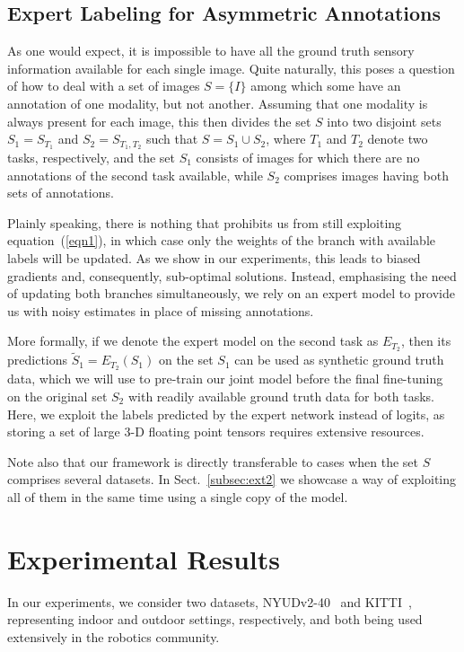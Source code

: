 \documentclass[letterpaper, 10 pt, conference]{ieeeconf}
\begin{document}
\subsection{Expert Labeling for Asymmetric Annotations}
\label{subsec:exp}
As one would expect, it is impossible to have all the ground truth sensory information available for each single image. Quite naturally, this poses a question of how to deal with a set of images $S=\{I\}$ among which some have an annotation of one modality, but not another. Assuming that one modality is always present for each image, this then divides the set $S$ into two disjoint sets $S_{1}=S_{T_{1}}$ and $S_{2}=S_{T_{1},T_{2}}$ such that $S=S_{1}\cup{S_{2}}$, where $T_{1}$ and $T_{2}$ denote two tasks, respectively, and the set $S_{1}$ consists of images for which there are no annotations of the second task available, while $S_{2}$ comprises images having both sets of annotations.

Plainly speaking, there is nothing that prohibits us from still exploiting equation~(\ref{eqn1}), in which case only the weights of the branch with available labels will be updated. As we show in our experiments, this leads to biased gradients and, consequently, sub-optimal solutions. Instead, emphasising the need of updating both branches simultaneously, we rely on an expert model to provide us with noisy estimates in place of missing annotations.

More formally, if we denote the expert model on the second task as $E_{T_{2}}$, then its predictions $\tilde{S}_{1}=E_{T_{2}}(S_{1})$ on the set $S_{1}$ can be used as synthetic ground truth data, which we will use to pre-train our joint model before the final fine-tuning on the original set $S_{2}$ with readily available ground truth data for both tasks. Here, we exploit the labels predicted by the expert network instead of logits, as storing a set of large $3$-D floating point tensors requires extensive resources.

Note also that our framework is directly transferable to cases when the set $S$ comprises several datasets. In Sect.~\ref{subsec:ext2} we showcase a way of exploiting all of them in the same time using a single copy of the model.

\section{Experimental Results}
\label{sec:result}

In our experiments, we consider two datasets, NYUDv2-40~\cite{SilbermanHKF12,GuptaAM13} and KITTI~\cite{GeigerLSU13,ros:2015}, representing indoor and outdoor settings, respectively, and both being used extensively in the robotics community.
\end{document}
